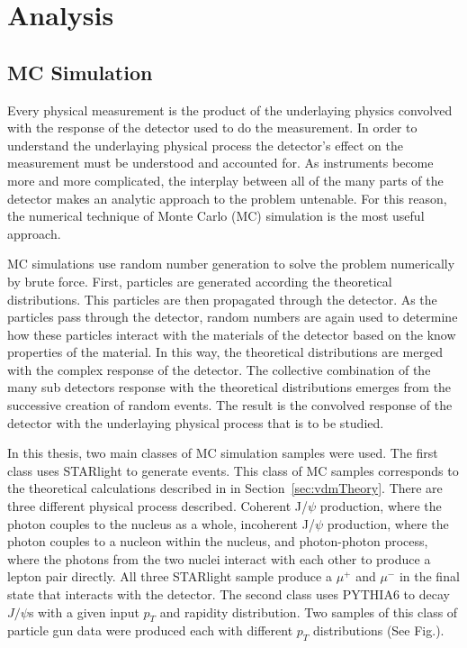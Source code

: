 \chapter{Analysis}	
  \section{\label{sec:mcSim} MC Simulation}
    Every physical measurement is the product of the underlaying physics 
      convolved with the response of the detector used to do the measurement. 
    In order to understand the underlaying physical process the detector's 
      effect on the measurement must be understood and accounted for. 
    As instruments become more and more complicated, the interplay between all
      of the many parts of the detector makes an analytic approach to the 
      problem untenable.
    For this reason, the numerical technique of Monte Carlo (MC) simulation is
      the most useful approach.

    MC simulations use random number generation to solve the problem 
      numerically by brute force. 
    First, particles are generated according the theoretical distributions.
    This particles are then propagated through the detector.
    As the particles pass through the detector, random numbers are again used
      to determine how these particles interact with the materials of the 
      detector based on the know properties of the material. 
    In this way, the theoretical distributions are merged with the complex 
      response of the detector. 
    The collective combination of the many sub detectors response with the 
      theoretical distributions emerges from the successive creation of random
      events.
    The result is the convolved response of the detector with the underlaying 
      physical process that is to be studied. 

    In this thesis, two main classes of MC simulation samples were used. 
    The first class uses STARlight to generate events.
    This class of MC samples corresponds to the theoretical calculations 
      described in in Section~\ref{sec:vdmTheory}.
    There are three different physical process described.
    Coherent J/$\psi$ production, where the photon couples to the nucleus as
      a whole, incoherent J/$\psi$ production, where the photon couples to a
      nucleon within the nucleus, and photon-photon process, where the photons
      from the two nuclei interact with each other to produce a lepton pair 
      directly.
    All three STARlight sample produce a $\mu^{+}$ and $\mu^{-}$ in the final 
      state that interacts with the detector.
    The second class uses PYTHIA6 to decay $J/\psi$s with a given
      input $p_{T}$ and rapidity distribution.
    Two samples of this class of particle gun data were produced each with 
      different $p_{T}$ distributions (See Fig.).

